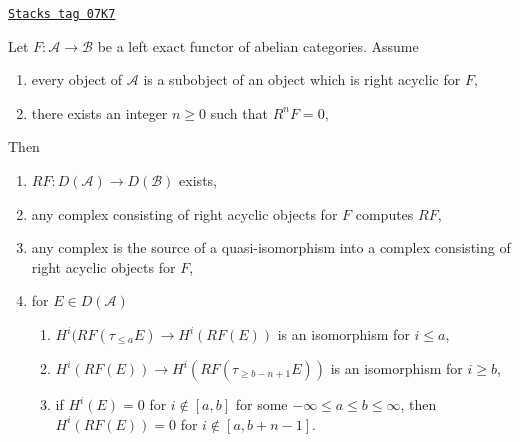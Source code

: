 \begin{lemma}
\label{derived-lemma-unbounded-right-derived}
\href{https://stacks.math.columbia.edu/tag/07K7}{\texttt{Stacks tag 07K7}}

Let $F : \mathcal{A} \to \mathcal{B}$ be a left exact functor of
abelian categories. Assume
\begin{enumerate}
\item every object of $\mathcal{A}$ is a subobject of an object
which is right acyclic for $F$,
\item there exists an integer $n \geq 0$ such that $R^nF = 0$,
\end{enumerate}
Then
\begin{enumerate}
\item $RF : D(\mathcal{A}) \to D(\mathcal{B})$ exists,
\item any complex consisting of right acyclic objects for $F$ computes $RF$,
\item any complex is the source of a quasi-isomorphism into a complex
consisting of right acyclic objects for $F$,
\item for $E \in D(\mathcal{A})$
\begin{enumerate}
\item $H^i(RF(\tau_{\leq a}E) \to H^i(RF(E))$ is an isomorphism
for $i \leq a$,
\item $H^i(RF(E)) \to H^i(RF(\tau_{\geq b - n + 1}E))$ is an isomorphism
for $i \geq b$,
\item if $H^i(E) = 0$ for $i \not \in [a, b]$ for some
$-\infty \leq a \leq b \leq \infty$, then $H^i(RF(E)) = 0$
for $i \not \in [a, b + n - 1]$.
\end{enumerate}
\end{enumerate}
\end{lemma}

